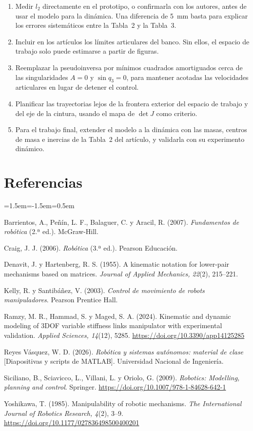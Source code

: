 \documentclass[11pt,a4paper]{article}
\begin{document}
\begin{enumerate}
\item Medir \(l_2\) directamente en el prototipo, o confirmarla con los autores, antes de usar el modelo para la dinámica. Una diferencia de 5~mm basta para explicar los errores sistemáticos entre la Tabla~2 y la Tabla~3.
\item Incluir en los artículos los límites articulares del banco. Sin ellos, el espacio de trabajo solo puede estimarse a partir de figuras.
\item Reemplazar la pseudoinversa por mínimos cuadrados amortiguados cerca de las singularidades \(A=0\) y \(\sin q_3=0\), para mantener acotadas las velocidades articulares en lugar de detener el control.
\item Planificar las trayectorias lejos de la frontera exterior del espacio de trabajo y del eje de la cintura, usando el mapa de \(\det J\) como criterio.
\item Para el trabajo final, extender el modelo a la dinámica con las masas, centros de masa e inercias de la Tabla~2 del artículo, y validarla con su experimento dinámico.
\end{enumerate}

\section*{Referencias}

\begin{list}{}{\leftmargin=1.5em\itemindent=-1.5em\itemsep=0.5em}
\item Barrientos, A., Peñín, L. F., Balaguer, C. y Aracil, R. (2007). \emph{Fundamentos de robótica} (2.ª ed.). McGraw-Hill.
\item Craig, J. J. (2006). \emph{Robótica} (3.ª ed.). Pearson Educación.
\item Denavit, J. y Hartenberg, R. S. (1955). A kinematic notation for lower-pair mechanisms based on matrices. \emph{Journal of Applied Mechanics, 22}(2), 215--221.
\item Kelly, R. y Santibáñez, V. (2003). \emph{Control de movimiento de robots manipuladores}. Pearson Prentice Hall.
\item Ramzy, M. R., Hammad, S. y Maged, S. A. (2024). Kinematic and dynamic modeling of 3DOF variable stiffness links manipulator with experimental validation. \emph{Applied Sciences, 14}(12), 5285. \url{https://doi.org/10.3390/app14125285}
\item Reyes Vásquez, W. D. (2026). \emph{Robótica y sistemas autónomos: material de clase} [Diapositivas y scripts de MATLAB]. Universidad Nacional de Ingeniería.
\item Siciliano, B., Sciavicco, L., Villani, L. y Oriolo, G. (2009). \emph{Robotics: Modelling, planning and control}. Springer. \url{https://doi.org/10.1007/978-1-84628-642-1}
\item Yoshikawa, T. (1985). Manipulability of robotic mechanisms. \emph{The International Journal of Robotics Research, 4}(2), 3--9. \url{https://doi.org/10.1177/027836498500400201}
\end{list}
\end{document}
